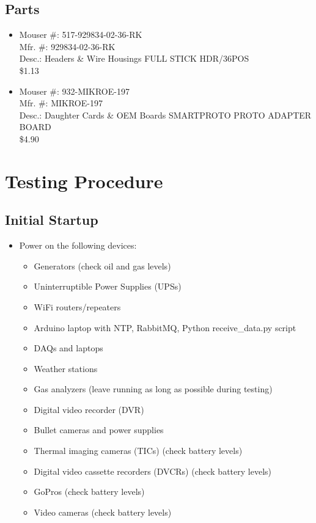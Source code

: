 \documentclass[11pt,oneside]{book}
\begin{document}
\section{Parts}

\begin{itemize}
\item Mouser \#:   517-929834-02-36-RK \\
Mfr. \#: 929834-02-36-RK \\
Desc.: Headers \& Wire Housings FULL STICK HDR/36POS \\
\$1.13

\item Mouser \#:   932-MIKROE-197 \\
Mfr. \#: MIKROE-197 \\
Desc.:  Daughter Cards \& OEM Boards SMARTPROTO PROTO ADAPTER BOARD \\
\$4.90
\end{itemize}




\appendix

\chapter{Testing Procedure}

\section{Initial Startup}

\begin{itemize}
\item Power on the following devices:
    \begin{itemize}
    \item Generators (check oil and gas levels)
    \item Uninterruptible Power Supplies (UPSs)
    \item WiFi routers/repeaters
    \item Arduino laptop with NTP, RabbitMQ, Python receive\_data.py script
    \item DAQs and laptops
    \item Weather stations
    \item Gas analyzers (leave running as long as possible during testing)
    \item Digital video recorder (DVR)
    \item Bullet cameras and power supplies
    \item Thermal imaging cameras (TICs) (check battery levels)
    \item Digital video cassette recorders (DVCRs) (check battery levels)
    \item GoPros (check battery levels)
    \item Video cameras (check battery levels)
    \end{itemize}
\end{itemize}
\end{document}
